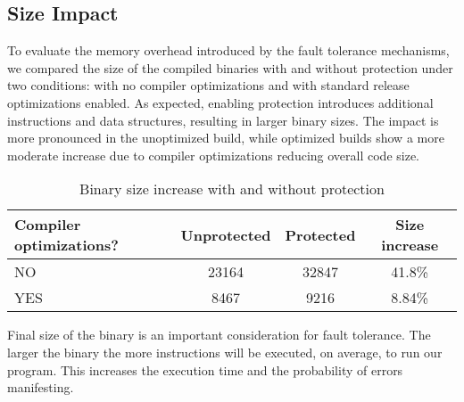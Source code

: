 \subsection{Size Impact}

To evaluate the memory overhead introduced by the fault tolerance mechanisms, we compared the size of the compiled binaries with and without protection under two conditions: with no compiler optimizations and with standard release optimizations enabled. As expected, enabling protection introduces additional instructions and data structures, resulting in larger binary sizes. The impact is more pronounced in the unoptimized build, while optimized builds show a more moderate increase due to compiler optimizations reducing overall code size.

\begin{table}[!h]
\centering
\begin{tabular}{|l|c|c|c|}
\hline
\textbf{Compiler optimizations?} & \textbf{Unprotected} & \textbf{Protected} & \textbf{Size increase} \\
\hline
NO  & 23164 & 32847 & 41.8\% \\
YES & 8467 & 9216 & 8.84\% \\
\hline
\end{tabular}
\caption{Binary size increase with and without protection}
\end{table}

Final size of the binary is an important consideration for fault tolerance. The larger the binary the more instructions will be executed, on average, to run our program. This increases the execution time and the probability of errors manifesting.
